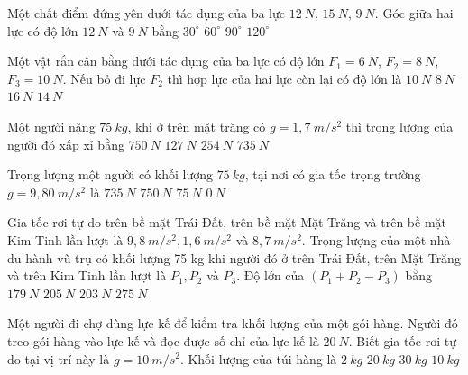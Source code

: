\begin{ex}%
Một chất điểm đứng yên dưới tác dụng của ba lực $12\ N$, $15\ N$, $9\ N$. Góc giữa hai lực có độ lớn $12\ N$ và $9\ N $ bằng
\choice
{$30^\circ$}
{$60^\circ$}
{\True $90^\circ$}
{$120^\circ$}
\end{ex}
\begin{ex}%
Một vật rắn cân bằng dưới tác dụng của ba lực có độ lớn $F_{1}=6\ N$, $F_{2}=8\ N$, $F_{3}=10\ N$. Nếu bỏ đi lực $F_{2}$ thì hợp lực của hai lực còn lại có độ lớn là
\choice
{$10\ N$}
{\True $8\ N$}
{$16\ N$}
{$14\ N$}	
 \end{ex}
\begin{ex}%
Một người nặng $75\ kg$, khi ở trên mặt trăng có $g = 1,7\ m/s^2$ thì trọng lượng của người đó xấp xỉ bằng
\choice
{$750\ N$}
{\True $127\ N$}
{$254\ N$}
{$735\ N$}
 \end{ex}
\begin{ex}%
 Trọng lượng một người có khối lượng $75\ kg$, tại nơi có gia tốc trọng trường $g = 9,80\ m/s^2$ là 
\choice
{\True $735\ N$}
{$750\ N$}
{$75\ N$}
{$0\ N$}
 \end{ex}	
\begin{ex}%
Gia tốc rơi tự do trên bề mặt Trái Đất, trên bề mặt Mặt Trăng và trên bề mặt Kim Tinh lần lượt là $9,8 \ m / s^2, 1,6 \ m / s^2$ và $8,7 \ m / s^2$. Trọng lượng của một nhà du hành vũ trụ có khối lượng 75 kg khi người đó ở trên Trái Đất, trên Mặt Trăng và trên Kim Tinh lần lượt là $P_1, P_2$ và $P_3$. Độ lớn của $\left(P_1+P_2-P_3\right)$ bằng
\choice
{$179 \ N$}
{$205 \ N$}
{\True $203 \ N$}
{$275 \ N$}
 \end{ex}	
\begin{ex}%
Một người đi chợ dùng lực kế để kiểm tra khối lượng của một gói hàng. Người đó treo gói hàng vào lực kế và đọc được số chỉ của lực kế là $20\ N$. Biết gia tốc rơi tự do tại vị trí này là $g=10\ m/s^2$. Khối lượng của túi hàng là
\choice
{\True $2\ kg$}
{$20\ kg$}
{$30\ kg$}
{$10\ kg$}
 \end{ex}	
